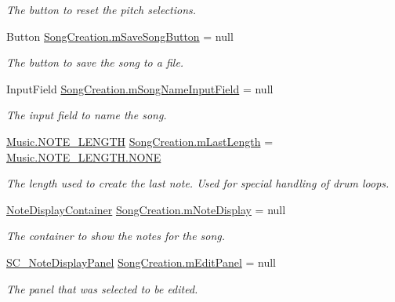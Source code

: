 \begin{DoxyCompactItemize}
\begin{DoxyCompactList}\small\item\em The button to reset the pitch selections. \end{DoxyCompactList}\item 
Button \hyperlink{group___s_c_priv_var_ga8bcdbe4c52da2e90edf9afffb35b48d3}{Song\+Creation.\+m\+Save\+Song\+Button} = null
\begin{DoxyCompactList}\small\item\em The button to save the song to a file. \end{DoxyCompactList}\item 
Input\+Field \hyperlink{group___s_c_priv_var_ga768474e1f768bfcce7010995020b09f3}{Song\+Creation.\+m\+Song\+Name\+Input\+Field} = null
\begin{DoxyCompactList}\small\item\em The input field to name the song. \end{DoxyCompactList}\item 
\hyperlink{group___music_enums_gaf11b5f079adbb21c800b9eca1c5c3cbd}{Music.\+N\+O\+T\+E\+\_\+\+L\+E\+N\+G\+TH} \hyperlink{group___s_c_priv_var_ga220707a4bf66dc6fee4e7bc9b7f2ed60}{Song\+Creation.\+m\+Last\+Length} = \hyperlink{group___music_enums_ggaf11b5f079adbb21c800b9eca1c5c3cbdab50339a10e1de285ac99d4c3990b8693}{Music.\+N\+O\+T\+E\+\_\+\+L\+E\+N\+G\+T\+H.\+N\+O\+NE}
\begin{DoxyCompactList}\small\item\em The length used to create the last note. Used for special handling of drum loops. \end{DoxyCompactList}\item 
\hyperlink{class_note_display_container}{Note\+Display\+Container} \hyperlink{group___s_c_priv_var_ga19cefeb7077126193c7f60d07dfdf32c}{Song\+Creation.\+m\+Note\+Display} = null
\begin{DoxyCompactList}\small\item\em The container to show the notes for the song. \end{DoxyCompactList}\item 
\hyperlink{class_s_c___note_display_panel}{S\+C\+\_\+\+Note\+Display\+Panel} \hyperlink{group___s_c_priv_var_ga0f5cfc2d0492190ded3fbda5b43b45e4}{Song\+Creation.\+m\+Edit\+Panel} = null
\begin{DoxyCompactList}\small\item\em The panel that was selected to be edited. \end{DoxyCompactList}\item 

\end{DoxyCompactItemize}
